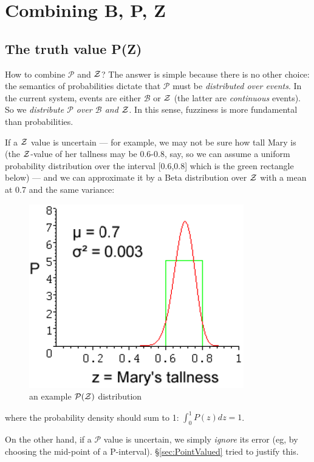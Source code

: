 \section{Combining B, P, Z}
\label{sec:combinePZ}

\subsection{The truth value P(Z)}
\label{sec:P(Z)-defined}

How to combine $\mathcal{P}$ and $\mathcal{Z}$?  The answer is simple because there is no other choice:  the semantics of probabilities dictate that $\mathcal{P}$ must be \textit{distributed over events}.  In the current system, events are either $\mathcal{B}$ or $\mathcal{Z}$ (the latter are \textit{continuous} events).  So we \emph{distribute $\mathcal{P}$ over $\mathcal{B}$ and $\mathcal{Z}$}.  In this sense, fuzziness is more fundamental than probabilities.

If a $\mathcal{Z}$ value is uncertain --- for example, we may not be sure how tall Mary is (the $\mathcal{Z}$-value of her tallness may be 0.6-0.8, say, so we can assume a uniform probability distribution over the interval [0.6,0.8] which is the green rectangle below) --- and we can approximate it by a Beta distribution over $\mathcal{Z}$ with a mean at 0.7 and the same variance:
\begin{figure}[H]
\centering
\includegraphics[scale=0.9]{P-over-Z-Marys-Tallness2.png}
\caption{an example $\mathcal{P}(\mathcal{Z})$ distribution}
\end{figure}
where the probability density should sum to 1: $ \int^1_0 P(z) dz = 1 $.

On the other hand, if a $\mathcal{P}$ value is uncertain, we simply \textit{ignore} its error (eg, by choosing the mid-point of a P-interval).  \S\ref{sec:PointValued} tried to justify this.

